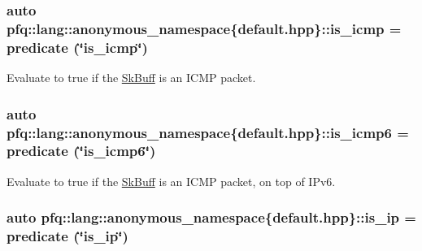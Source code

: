 \hypertarget{namespacepfq_1_1lang_1_1anonymous__namespace_02default_8hpp_03_a01ccba89c8582ba423393226b54f12de}{
\subsubsection[{is\+\_\+icmp}]{\setlength{\rightskip}{0pt plus 5cm}auto pfq\+::lang\+::anonymous\+\_\+namespace\{default.\+hpp\}\+::is\+\_\+icmp = {\bf predicate} (\char`\"{}is\+\_\+icmp\char`\"{})}}\label{namespacepfq_1_1lang_1_1anonymous__namespace_02default_8hpp_03_a01ccba89c8582ba423393226b54f12de}


Evaluate to {\ttfamily true} if the \hyperlink{structpfq_1_1lang_1_1SkBuff}{Sk\+Buff} is an I\+C\+M\+P packet. 

\hypertarget{namespacepfq_1_1lang_1_1anonymous__namespace_02default_8hpp_03_a01d6e9764945cc33a11f3ce6a9925549}{
\subsubsection[{is\+\_\+icmp6}]{\setlength{\rightskip}{0pt plus 5cm}auto pfq\+::lang\+::anonymous\+\_\+namespace\{default.\+hpp\}\+::is\+\_\+icmp6 = {\bf predicate} (\char`\"{}is\+\_\+icmp6\char`\"{})}}\label{namespacepfq_1_1lang_1_1anonymous__namespace_02default_8hpp_03_a01d6e9764945cc33a11f3ce6a9925549}


Evaluate to {\ttfamily true} if the \hyperlink{structpfq_1_1lang_1_1SkBuff}{Sk\+Buff} is an I\+C\+M\+P packet, on top of I\+Pv6. 

\hypertarget{namespacepfq_1_1lang_1_1anonymous__namespace_02default_8hpp_03_aa97a34e12e4c6bc2d85a5c169800cfa4}{
\subsubsection[{is\+\_\+ip}]{\setlength{\rightskip}{0pt plus 5cm}auto pfq\+::lang\+::anonymous\+\_\+namespace\{default.\+hpp\}\+::is\+\_\+ip = {\bf predicate} (\char`\"{}is\+\_\+ip\char`\"{})}}\label{namespacepfq_1_1lang_1_1anonymous__namespace_02default_8hpp_03_aa97a34e12e4c6bc2d85a5c169800cfa4}


